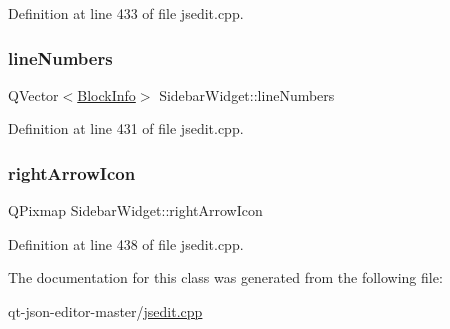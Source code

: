 Definition at line 433 of file jsedit.\+cpp.

\mbox{\label{class_sidebar_widget_ac6820d4338c9763dd3b6a2da710a0fb0}} 
\subsubsection{\texorpdfstring{line\+Numbers}{lineNumbers}}
{\footnotesize\ttfamily Q\+Vector$<$\hyperlink{struct_block_info}{Block\+Info}$>$ Sidebar\+Widget\+::line\+Numbers}



Definition at line 431 of file jsedit.\+cpp.

\mbox{\label{class_sidebar_widget_a7af9c03c7765c0ba88116fb397de74b5}} 
\subsubsection{\texorpdfstring{right\+Arrow\+Icon}{rightArrowIcon}}
{\footnotesize\ttfamily Q\+Pixmap Sidebar\+Widget\+::right\+Arrow\+Icon}



Definition at line 438 of file jsedit.\+cpp.



The documentation for this class was generated from the following file\+:\begin{DoxyCompactItemize}
\item 
qt-\/json-\/editor-\/master/\hyperlink{jsedit_8cpp}{jsedit.\+cpp}\end{DoxyCompactItemize}
